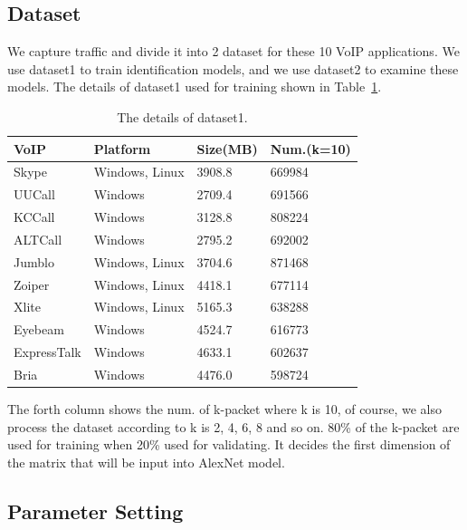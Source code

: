 \documentclass[conference]{IEEEtran}
\begin{document}
\subsection{Dataset}
\label{sec:dataset}
We capture traffic and divide it into 2 dataset for these 10 VoIP applications. We use dataset1 to train identification models, and we use dataset2 to examine these models. The details of dataset1 used for training shown in Table~\ref{tab:traffic}.

\begin{table}[htbp]
  \caption{The details of dataset1.}
  \label{tab:traffic}
  \centering
  \begin{tabular}{p{1.5cm}p{2cm}p{1cm}p{1.5cm}}
    \hline
    VoIP & Platform & Size(MB)& Num.(k=10)\\
    \hline
    Skype      & Windows, Linux  & 3908.8  &  669984  \\
    UUCall      & Windows  & 2709.4  &  691566  \\
    KCCall      & Windows  & 3128.8  &  808224  \\
    ALTCall      & Windows  & 2795.2  &  692002  \\
    Jumblo      & Windows, Linux  & 3704.6  &  871468  \\
    Zoiper      & Windows, Linux  & 4418.1  &  677114  \\
    Xlite      & Windows, Linux  & 5165.3  &  638288  \\
    Eyebeam      & Windows  & 4524.7  &  616773  \\
    ExpressTalk      & Windows  & 4633.1  &  602637  \\
    Bria      & Windows  & 4476.0  &  598724  \\
    \hline
  \end{tabular}
\end{table}

The forth column shows the num. of k-packet where k is 10, of course, we also process the dataset according to k is 2, 4, 6, 8 and so on. 80\% of the k-packet are used for training when 20\% used for validating. It decides the first dimension of the matrix that will be input into AlexNet model.

\subsection{Parameter Setting}
\label{sec:params}
\end{document}
